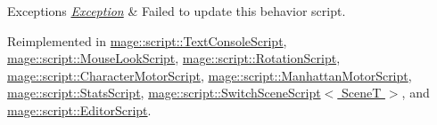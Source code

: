 \begin{DoxyExceptions}{Exceptions}
{\em \hyperlink{classmage_1_1_exception}{Exception}} & Failed to update this behavior script. \\
\hline
\end{DoxyExceptions}


Reimplemented in \hyperlink{classmage_1_1script_1_1_text_console_script_ad619f93a946660b30f5e39821778f7b0}{mage\+::script\+::\+Text\+Console\+Script}, \hyperlink{classmage_1_1script_1_1_mouse_look_script_a3b78aebd104b061f5d176843ef58a48a}{mage\+::script\+::\+Mouse\+Look\+Script}, \hyperlink{classmage_1_1script_1_1_rotation_script_af4e83590b78094186b0dd107a58c7b3a}{mage\+::script\+::\+Rotation\+Script}, \hyperlink{classmage_1_1script_1_1_character_motor_script_ae738c9550e17be133291ccd2a6681368}{mage\+::script\+::\+Character\+Motor\+Script}, \hyperlink{classmage_1_1script_1_1_manhattan_motor_script_af1ee420e1378bf930cce1ce92a37d640}{mage\+::script\+::\+Manhattan\+Motor\+Script}, \hyperlink{classmage_1_1script_1_1_stats_script_aad8c3b8fb846d47605b1f1d14f1ea157}{mage\+::script\+::\+Stats\+Script}, \hyperlink{classmage_1_1script_1_1_switch_scene_script_a04b60ff2b34f490012e4115ae1e788d7}{mage\+::script\+::\+Switch\+Scene\+Script$<$ Scene\+T $>$}, and \hyperlink{classmage_1_1script_1_1_editor_script_a311532d499edfaf3f74aa598fb87ec8e}{mage\+::script\+::\+Editor\+Script}.

